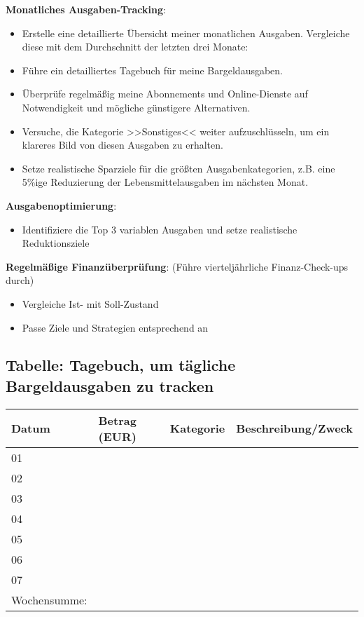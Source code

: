 \documentclass{vorlage-design-main}
\begin{document}
\textbf{Monatliches Ausgaben-Tracking}:

\begin{itemize}

\item
  Erstelle eine detaillierte Übersicht meiner monatlichen Ausgaben.
  Vergleiche diese mit dem Durchschnitt der letzten drei Monate:
\item
  Führe ein detailliertes Tagebuch für meine Bargeldausgaben.
\item
  Überprüfe regelmäßig meine Abonnements und Online-Dienste auf
  Notwendigkeit und mögliche günstigere Alternativen.
\item
  Versuche, die Kategorie >>Sonstiges<< weiter aufzuschlüsseln, um ein
  klareres Bild von diesen Ausgaben zu erhalten.
\item
  Setze realistische Sparziele für die größten Ausgabenkategorien, z.B.
  eine 5\%ige Reduzierung der Lebensmittelausgaben im nächsten Monat.
\end{itemize}

\textbf{Ausgabenoptimierung}:

\begin{itemize}

\item
  Identifiziere die Top 3 variablen Ausgaben und setze realistische
  Reduktionsziele
\end{itemize}

\textbf{Regelmäßige Finanzüberprüfung}: (Führe vierteljährliche
Finanz-Check-ups durch)

\begin{itemize}

\item
  Vergleiche Ist- mit Soll-Zustand
\item
  Passe Ziele und Strategien entsprechend an
\end{itemize}

\subsection{Tabelle: Tagebuch, um tägliche Bargeldausgaben zu
tracken}\label{tabelle-tagebuch-um-taegliche-bargeldausgaben-zu-tracken}

\begin{table}[ht]
  \begin{tabular}{@{}llll@{}}
  \toprule

Datum & Betrag (EUR) & Kategorie & Beschreibung/Zweck \\
\midrule[\heavyrulewidth]
01 & & & \\
02 & & & \\
03 & & & \\
04 & & & \\
05 & & & \\
06 & & & \\
07 & & & \\
Wochensumme: & & & \\
  \bottomrule
  \end{tabular}%
\end{table}


\clearpage
\printbibliography
\end{document}
